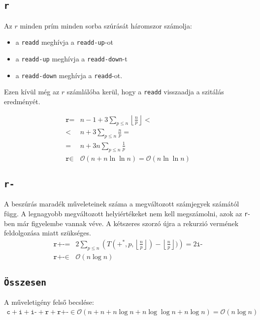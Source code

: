 \documentclass{article}
\begin{document}
\subsection{\texttt{r}}

Az $r$ minden prím minden sorba szúrását háromszor számolja:
\begin{itemize}
\item a \texttt{readd} meghívja a \texttt{readd-up}-ot
\item a \texttt{readd-up} meghívja a \texttt{readd-down}-t
\item a \texttt{readd-down} meghívja a \texttt{readd}-ot.
\end{itemize}
Ezen kívül még az $r$ számlálóba kerül, hogy a \texttt{readd} visszaadja a szitálás eredményét.

\begin{align*}
\texttt{r} =& n - 1 + 3 \sum_{p \le n} \left\lfloor \frac{n}{p} \right\rfloor < \\
<& n + 3 \sum_{p \le n} \frac{n}{p} = \\
=& n + 3n \sum_{p \le n} \frac{1}{p} \\
\texttt{r} \in& \mathcal{O}(n + n \ln{\ln{n}}) = \mathcal{O}(n \ln{\ln{n}})
\end{align*}

\subsection{\texttt{r-}}

A beszúrás maradék műveleteinek száma a megváltozott számjegyek számától függ.
A legnagyobb megváltozott helyiértékeket nem kell megszámolni, azok az \texttt{r}-ben már figyelembe vannak véve.
A kétszeres szorzó újra a rekurzió vermének feldolgozása miatt szükséges.
\begin{align*}
\texttt{r+-} =& 2 \sum_{p \le n} \left( T(+^*, p, \left\lfloor \frac{n}{p} \right\rfloor) - \left\lfloor \frac{n}{p} \right\rfloor) \right)
= 2 \texttt{i-} \\
\texttt{r+-} \in& \mathcal{O}(n \log{n})
\end{align*}

\subsection{\texttt{Összesen}}

A műveletigény felső becslése:
\begin{align*}
\texttt{c}+\texttt{i}+\texttt{i-}+\texttt{r}+\texttt{r+-}
\in \mathcal{O}(n + n + n \log{n} + n \log{\log{n}} + n \log{n})
= \mathcal{O}(n \log{n})
\end{align*}
\end{document}
